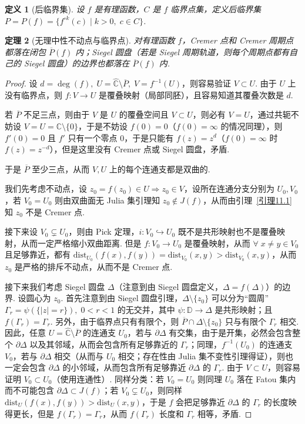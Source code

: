 \documentclass[11pt, a4paper, oneside]{ctexart}
\newtheorem{theorem}{定理}[section]
\newtheorem{definition}[theorem]{定义}
\newcommand{\C}{\mathbb{C}}
\newcommand{\D}{\mathbb{D}}
\newcommand{\dist}{\mathrm{dist}}
\newcommand{\abs}[1]{\left|{#1}\right|}
\begin{document}
    \begin{definition}[后临界集]
        设 $f$ 是有理函数，$C$ 是 $f$ 临界点集，定义后临界集 $P=P(f)=\{f^{\circ k}(c)\mid k>0,\; c\in C\}$.
    \end{definition}
    \begin{theorem}[无理中性不动点与临界点]
        对有理函数 $f$，Cremer 点和 Cremer 周期点都落在闭包 $\overline{P}(f)$ 内；Siegel 圆盘（若是 Siegel 周期轨道，则每个周期点都有自己的 Siegel 圆盘）的边界也都落在 $\overline{P}(f)$ 内.
    \end{theorem}
    \begin{proof}
        设 $d=\deg(f),\; U=\hat{\C}\setminus\overline{P},\; V=f^{-1}(U)$，则容易验证 $V\subset U$. 由于 $U$ 上没有临界点，则 $f:V\to U$ 是覆叠映射（局部同胚），且容易知道其覆叠次数是 $d$.

        若 $\overline{P}$ 不足三点，则由于 $V$ 是 $U$ 的覆叠空间且 $V\subset U$，则必有 $V=U$，通过共轭不妨设 $V=U=\C\setminus\{0\}$，于是不妨设 $f(0)=0$（$f(0)=\infty$ 的情况同理），则 $f'(0)=0$ 且 $f'$ 只有一个零点 $0$，于是只能有 $f(z)=z^d$（$f(0)=\infty$ 时 $f(z)=z^{-d}$），但是这里没有 Cremer 点或 Siegel 圆盘，矛盾.

        于是 $\overline{P}$ 至少三点，从而 $V, U$ 上的每个连通支都是双曲的.
        
        我们先考虑不动点，设 $z_0=f(z_0)\in U\Rightarrow z_0\in V$，设所在连通分支分别为 $U_0,V_0$，若 $V_0=U_0$ 则由双曲面无 Julia 集引理知 $z_0\notin J(f)$，从而由引理~\ref{引理11.1} 知 $z_0$ 不是 Cremer 点.

        接下来设 $V_0\subsetneq U_0$，则由 Pick 定理，$i:V_0\hookrightarrow U_0$ 既不是共形映射也不是覆叠映射，从而一定严格缩小双曲距离. 但是 $f:V_0\to U_0$ 是覆叠映射，从而 $\forall\; x\neq y\in V_0$ 且足够靠近，都有 $\dist_{U_0}(f(x),f(y))=\dist_{V_0}(x,y)>\dist_{V_0}(x,y)$，从而 $z_0$ 是严格的排斥不动点，从而不是 Cremer 点.

        接下来我们考虑 Siegel 圆盘 $\Delta$（注意到由 Siegel 圆盘定义，$\Delta=f(\Delta)$）的边界. 设圆心为 $z_0$. 首先注意到由 Siegel 圆盘引理，$\Delta\setminus\{z_0\}$ 可以分为“圆周” $\Gamma_r=\psi(\{\abs{z}=r\}),\; 0<r<1$ 的无交并，其中 $\psi:\D\to \Delta$ 是共形映射；且 $f(\Gamma_r)=\Gamma_r$. 另外，由于临界点只有有限个，则 $\overline{P}\cap \Delta\setminus\{z_0\}$ 只与有限个 $\Gamma_r$ 相交. 因此，任意 $U=\hat{\C}\setminus \overline{P}$ 的连通支 $U_0$，若与 $\partial\Delta$ 有交集，由于是开集，必然会包含整个 $\partial\Delta$ 以及其邻域，从而会包含所有足够靠近的 $\Gamma_r$；同理，$f^{-1}(U_0)$ 的连通支 $V_0$，若与 $\partial\Delta$ 相交（从而与 $U_0$ 相交；存在性由 Julia 集不变性引理得证），则也一定会包含 $\partial\Delta$ 的小邻域，从而包含所有足够靠近 $\partial\Delta$ 的 $\Gamma_r$. 由于 $V\subset U$，则容易证明 $V_0\subset U_0$（使用连通性）. 同样分类：若 $V_0=U_0$ 则同理 $U_0$ 落在 Fatou 集内而不可能包含 $\partial\Delta\subset J(f)$；若 $V_0\subsetneq U_0$，则同样 $\dist_U(f(x),f(y))>\dist_U(x,y)$，于是 $f$ 会把足够靠近 $\partial\Delta$ 的 $\Gamma_r$ 的长度映得更长，但是 $f(\Gamma_r)=\Gamma_r$，从而 $f(\Gamma_r)$ 长度和 $\Gamma_r$ 相等，矛盾.


\end{proof}
\end{document}
